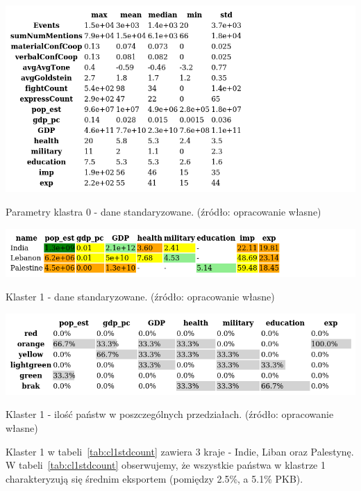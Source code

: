 \documentclass[11pt]{report}
\begin{document}
    \begin{table}[!htp]
        \centering
        \includegraphics[width=\linewidth]{tables/CLUST/desc/clust0std_desc.png}
        \caption{Parametry klastra 0 - dane standaryzowane. (źródło: opracowanie własne)}
        \label{tab:cl0std_desc}
    \end{table}

    \begin{table}[!htp]
        \centering
        \includegraphics[width=\linewidth]{tables/CLUST/cluster1stdkmeans.png}
        \caption{Klaster 1 - dane standaryzowane. (źródło: opracowanie własne)}
        \label{tab:cl1std}
    \end{table}

    \begin{table}[!htp]
        \centering
        \includegraphics[width=\linewidth]{tables/CLUST/cluster1stdkmeanscount.png}
        \caption{Klaster 1 - ilość państw w poszczególnych przedziałach. (źródło: opracowanie własne)}
        \label{tab:cl1stdcount}
    \end{table}

    Klaster 1 w tabeli~\ref{tab:cl1stdcount} zawiera 3 kraje - Indie, Liban oraz Palestynę.
    W tabeli~\ref{tab:cl1stdcount} obserwujemy, że wszystkie państwa w klastrze 1 charakteryzują się średnim eksportem (pomiędzy 2.5\%, a 5.1\% PKB).
\end{document}
